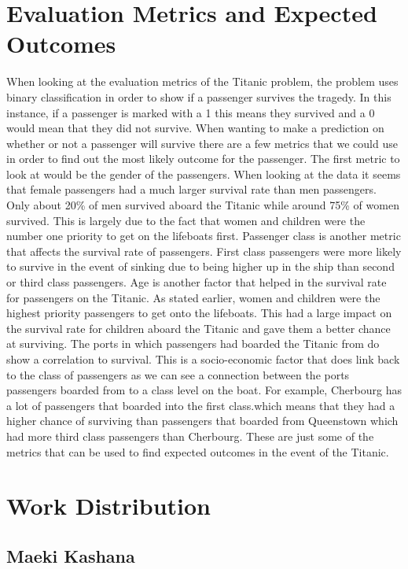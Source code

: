\documentclass{APA}
\begin{document}
\section{Evaluation Metrics and Expected Outcomes}
	When looking at the evaluation metrics of the Titanic problem, the problem uses binary classification in order to show if a passenger survives the tragedy. In this instance, if a passenger is marked with a 1 this means they survived and a 0 would mean that they did not survive. When wanting to make a prediction on whether or not a passenger will survive there are a few metrics that we could use in order to find out the most likely outcome for the passenger.
	The first metric to look at would be the gender of the passengers. When looking at the data it seems that female passengers had a much larger survival rate than men passengers. Only about 20\% of men survived aboard the Titanic while around 75\% of women survived. This is largely due to the fact that women and children were the number one priority to get on the lifeboats first. Passenger class is another metric that affects the survival rate of passengers. First class passengers were more likely to survive in the event of sinking due to being higher up in the ship than second or third class passengers. Age is another factor that helped in the survival rate for passengers on the Titanic. As stated earlier, women and children were the highest priority passengers to get onto the lifeboats. This had a large impact on the survival rate for children aboard the Titanic and gave them a better chance at surviving. The ports in which passengers had boarded the Titanic from do show a correlation to survival. This is a socio-economic factor that does link back to the class of passengers as we can see a connection between the ports passengers boarded from to a class level on the boat. For example, Cherbourg has a lot of passengers that boarded into the first class.which means that they had a higher chance of surviving than passengers that boarded from Queenstown which had more third class passengers than Cherbourg. These are just some of the metrics that can be used to find expected outcomes in the event of the Titanic.

\newpage



\section{Work Distribution}

\subsection{Maeki Kashana}
\end{document}
